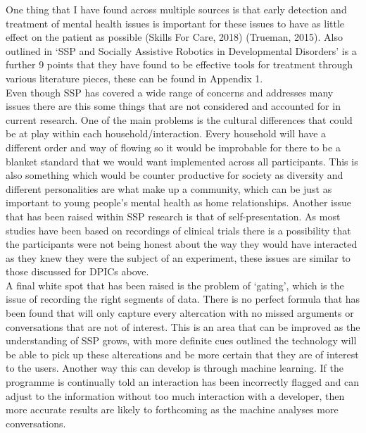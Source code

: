 \documentclass[a4paper,11pt]{report}
\begin{document}
One thing that I have found across multiple sources is that early detection and treatment of mental health issues is important for these issues to have as little effect on the patient as possible (Skills For Care, 2018) (Trueman, 2015). Also outlined in ‘SSP and Socially Assistive Robotics in Developmental Disorders’ is a further 9 points that they have found to be effective tools for treatment through various literature pieces, these can be found in Appendix 1.\\

Even though SSP has covered a wide range of concerns and addresses many issues there are this some things that are not considered and accounted for in current research. One of the main problems is the cultural differences that could be at play within each household/interaction. Every household will have a different order and way of flowing so it would be improbable for there to be a blanket standard that we would want implemented across all participants. This is also something which would be counter productive for society as diversity and different personalities are what make up a community, which can be just as important to young people’s mental health as home relationships. Another issue that has been raised within SSP research is that of self-presentation. As most studies have been based on recordings of clinical trials there is a possibility that the participants were not being honest about the way they would have interacted as they knew they were the subject of an experiment, these issues are similar to those discussed for DPICs above.\\

A final white spot that has been raised is the problem of ‘gating’, which is the issue of recording the right segments of data. There is no perfect formula that has been found that will only capture every altercation with no missed arguments or conversations that are not of interest. This is an area that can be improved as the understanding of SSP grows, with more definite cues outlined the technology will be able to pick up these altercations and be more certain that they are of interest to the users. Another way this can develop is through machine learning. If the programme is continually told an interaction has been incorrectly flagged and can adjust to the information without too much interaction with a developer, then more accurate results are likely to forthcoming as the machine analyses more conversations.\\
\end{document}
